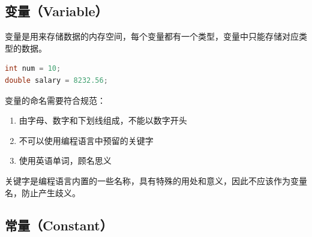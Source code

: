 \subsection{变量（Variable）}

变量是用来存储数据的内存空间，每个变量都有一个类型，变量中只能存储对应类型的数据。

\vspace{-0.5cm}

\begin{lstlisting}[language=C]
int num = 10;
double salary = 8232.56;
\end{lstlisting}

\vspace{0.5cm}

变量的命名需要符合规范：

\begin{enumerate}
	\item 由字母、数字和下划线组成，不能以数字开头
	\item 不可以使用编程语言中预留的关键字
	\item 使用英语单词，顾名思义
\end{enumerate}

关键字是编程语言内置的一些名称，具有特殊的用处和意义，因此不应该作为变量名，防止产生歧义。\\

\begin{table}[H]
	\centering
	\caption{关键字}
\end{table}

\vspace{0.5cm}

\subsection{常量（Constant）}

